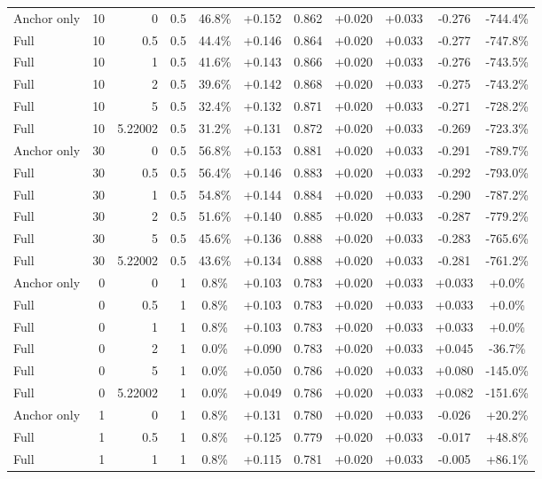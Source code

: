 \begin{table}[htbp]
\begin{tabular}{lrrrccccccc}
Anchor only & 10 & 0 & 0.5 & 46.8\% & +0.152 & 0.862 & +0.020 & +0.033 & -0.276 & -744.4\% \\
Full & 10 & 0.5 & 0.5 & 44.4\% & +0.146 & 0.864 & +0.020 & +0.033 & -0.277 & -747.8\% \\
Full & 10 & 1 & 0.5 & 41.6\% & +0.143 & 0.866 & +0.020 & +0.033 & -0.276 & -743.5\% \\
Full & 10 & 2 & 0.5 & 39.6\% & +0.142 & 0.868 & +0.020 & +0.033 & -0.275 & -743.2\% \\
Full & 10 & 5 & 0.5 & 32.4\% & +0.132 & 0.871 & +0.020 & +0.033 & -0.271 & -728.2\% \\
Full & 10 & 5.22002 & 0.5 & 31.2\% & +0.131 & 0.872 & +0.020 & +0.033 & -0.269 & -723.3\% \\
Anchor only & 30 & 0 & 0.5 & 56.8\% & +0.153 & 0.881 & +0.020 & +0.033 & -0.291 & -789.7\% \\
Full & 30 & 0.5 & 0.5 & 56.4\% & +0.146 & 0.883 & +0.020 & +0.033 & -0.292 & -793.0\% \\
Full & 30 & 1 & 0.5 & 54.8\% & +0.144 & 0.884 & +0.020 & +0.033 & -0.290 & -787.2\% \\
Full & 30 & 2 & 0.5 & 51.6\% & +0.140 & 0.885 & +0.020 & +0.033 & -0.287 & -779.2\% \\
Full & 30 & 5 & 0.5 & 45.6\% & +0.136 & 0.888 & +0.020 & +0.033 & -0.283 & -765.6\% \\
Full & 30 & 5.22002 & 0.5 & 43.6\% & +0.134 & 0.888 & +0.020 & +0.033 & -0.281 & -761.2\% \\
Anchor only & 0 & 0 & 1 & 0.8\% & +0.103 & 0.783 & +0.020 & +0.033 & +0.033 & +0.0\% \\
Full & 0 & 0.5 & 1 & 0.8\% & +0.103 & 0.783 & +0.020 & +0.033 & +0.033 & +0.0\% \\
Full & 0 & 1 & 1 & 0.8\% & +0.103 & 0.783 & +0.020 & +0.033 & +0.033 & +0.0\% \\
Full & 0 & 2 & 1 & 0.0\% & +0.090 & 0.783 & +0.020 & +0.033 & +0.045 & -36.7\% \\
Full & 0 & 5 & 1 & 0.0\% & +0.050 & 0.786 & +0.020 & +0.033 & +0.080 & -145.0\% \\
Full & 0 & 5.22002 & 1 & 0.0\% & +0.049 & 0.786 & +0.020 & +0.033 & +0.082 & -151.6\% \\
Anchor only & 1 & 0 & 1 & 0.8\% & +0.131 & 0.780 & +0.020 & +0.033 & -0.026 & +20.2\% \\
Full & 1 & 0.5 & 1 & 0.8\% & +0.125 & 0.779 & +0.020 & +0.033 & -0.017 & +48.8\% \\
Full & 1 & 1 & 1 & 0.8\% & +0.115 & 0.781 & +0.020 & +0.033 & -0.005 & +86.1\% \\

\end{tabular}
\end{table}
